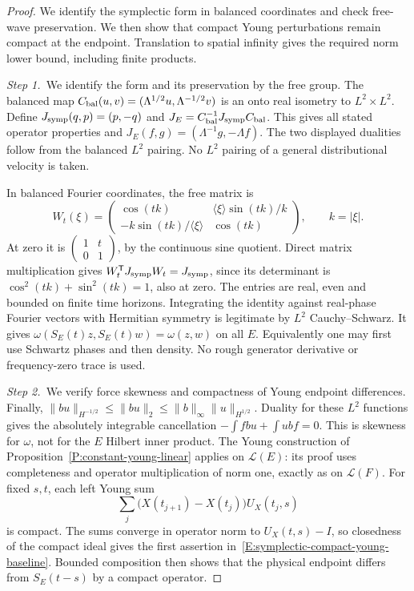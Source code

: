 \begin{proof}
  We identify the symplectic form in balanced coordinates and check free-wave
  preservation. We then show that compact Young perturbations remain compact
  at the endpoint. Translation to spatial infinity gives the required norm
  lower bound, including finite products.


  \medskip
  \noindent\textit{Step 1.~}We identify the form and its preservation by the
  free group.
  The balanced map $C_{\rm bal}(u,v) = (\Lambda^{1/2}u,\Lambda^{-1/2}v)$ is an
  onto real isometry to $L^2\times L^2$. Define $J_{\rm symp}(q,p) = (p,-q)$ and
  $J_E = C_{\rm bal}^{-1}J_{\rm symp}C_{\rm bal}$. This gives all stated
  operator properties and $J_E(f,g) = (\Lambda^{-1}g,-\Lambda f)$. The two
  displayed dualities follow from the balanced $L^2$ pairing. No $L^2$ pairing
  of a general distributional velocity is taken.

  In balanced Fourier coordinates, the free matrix is
  \[
    W_t(\xi)=
    \begin{pmatrix}
      \cos(tk)&\langle\xi\rangle\sin(tk)/k\\
      -k\sin(tk)/\langle\xi\rangle&\cos(tk)
    \end{pmatrix},\qquad k=|\xi|.
  \]
  At zero it is $\left(\begin{smallmatrix}1&t\\0&1\end{smallmatrix}\right)$, by
  the continuous sine quotient. Direct matrix multiplication gives
  $W_t^{\mathsf{T}}J_{\rm symp}W_t = J_{\rm symp}$, since its determinant is
  $\cos^2(tk)+\sin^2(tk) = 1$, also at zero. The entries are real, even and
  bounded on finite time horizons. Integrating the identity against real-phase
  Fourier vectors with Hermitian symmetry is legitimate by $L^2$
  Cauchy--Schwarz. It gives $\omega(S_E(t)z,S_E(t)w) = \omega(z,w)$ on all $E$.
  Equivalently one may first use Schwartz phases and then density. No rough
  generator derivative or frequency-zero trace is used.


  \medskip
  \noindent\textit{Step 2.~}We verify force skewness and compactness of Young
  endpoint differences.
  Finally, $\|bu\|_{H^{-1/2}} \le \|bu\|_2 \le \|b\|_\infty\|u\|_{H^{1/2}}$.
  Duality for these $L^2$ functions gives the absolutely integrable cancellation
  $-\int fbu+\int ubf = 0$. This is skewness for $\omega$, not for the $E$
  Hilbert inner product. The Young construction of
  Proposition~\ref{P:constant-young-linear} applies on $\mathcal{L}(E)$: its
  proof uses completeness and operator multiplication of norm one, exactly as on
  $\mathcal{L}(F)$. For fixed $s,t$, each left Young sum
  \[
    \sum_j\big(X(t_{j+1})-X(t_j)\big)U_X(t_j,s)
  \]
  is compact. The sums converge in operator norm to $U_X(t,s)-I$, so closedness
  of the compact ideal gives the first assertion
  in~\eqref{E:symplectic-compact-young-baseline}. Bounded composition then shows
  that the physical endpoint differs from $S_E(t-s)$ by a compact operator.



\end{proof}
